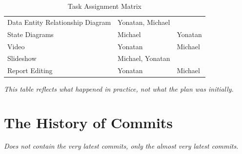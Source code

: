 \documentclass[11pt]{article}
\begin{document}
\begin{table}[H]
\begin{tabular}{lll}
            Data Entity Relationship Diagram   & Yonatan, Michael    &                  \\
            State Diagrams                     & Michael             & Yonatan          \\
            Video                              & Yonatan             & Michael          \\
            Slideshow                          & Michael, Yonatan    &                  \\
            Report Editing                     & Yonatan             & Michael          \\
            \bottomrule
        \end{tabular}
        \caption{Task Assignment Matrix}\label{tab:table}
    \end{table}

    \textsl{This table reflects what happened in practice, not what the plan was initially.}

    \begin{figure}
        \label{fig:Gant Chart} %
    \end{figure}
    \pagebreak


    \section{The History of Commits}\label{sec:the-history-of-commits}

    \textsl{Does not contain the very latest commits, only the almost very latest commits.}
\end{document}
